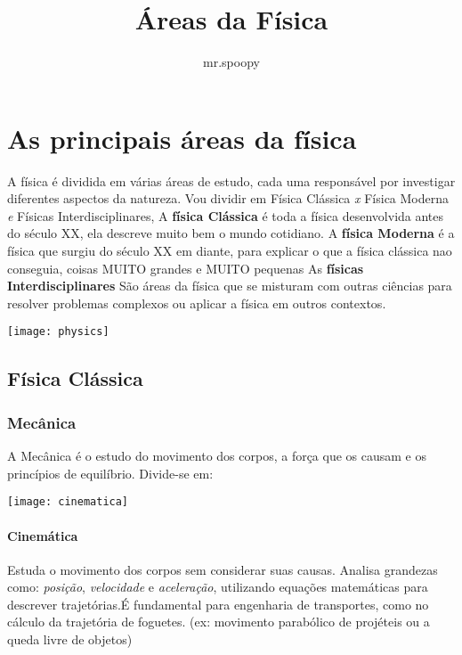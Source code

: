 \documentclass[portuguese,11pt,a4paper,oneside,openany,notitlepage]{article}
\title{Áreas da Física}
\author{mr.spoopy}
\begin{document}
	\maketitle
	
	\section{As principais áreas da \textbf{física}}
	
	A física é dividida em várias áreas de estudo, cada uma responsável por investigar diferentes aspectos da natureza. Vou dividir em Física Clássica \textit{x} Física Moderna \textit{e} Físicas Interdisciplinares, \newline A \textbf{física Clássica} é toda a física desenvolvida antes do século XX, ela descreve muito bem o mundo cotidiano. \newline A \textbf{física Moderna} é a física que surgiu do século XX em diante, para explicar o que a física clássica nao conseguia, coisas MUITO grandes e MUITO pequenas \newline As \textbf{físicas Interdisciplinares} São áreas da física que se misturam com outras ciências para resolver problemas complexos ou aplicar a física em outros contextos.
	
	\begin{center}
		\texttt{[image: physics]}
	\end{center}
	
	
	\subsection{Física Clássica}
	
	\subsubsection{Mecânica}
	A Mecânica é o estudo do movimento dos corpos, a força que os causam e os princípios de equilíbrio. Divide-se em:
	
	\begin{center}
		\texttt{[image: cinematica]}
	\end{center}
	
	\paragraph{Cinemática}
	Estuda o movimento dos corpos sem considerar suas causas. Analisa grandezas como: \textit{posição}, \textit{velocidade} e \textit{aceleração}, utilizando equações matemáticas para descrever trajetórias.\newline É fundamental para engenharia de transportes, como no cálculo da trajetória de foguetes. \newline (ex: movimento parabólico de projéteis ou a queda livre de objetos)
	
\end{document}
